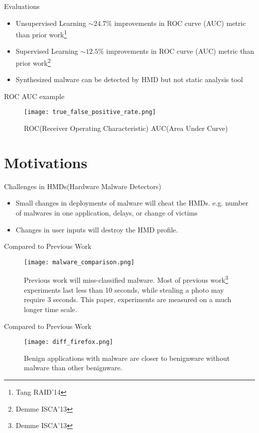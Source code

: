 \documentclass{beamer}
\begin{document}
\begin{frame}{Evaluations}
	\begin{itemize}
		\item Unsupervised Learning $\sim24.7\%$ improvements in ROC curve
			(AUC) metric than prior work\footnote[frame]{Tang RAID'14}
		\item Supervised Learning $\sim12.5\%$ improvements in ROC curve
			(AUC) metric than prior work\footnote[frame]{Demme ISCA'13}
		\item Synthesized malware can be detected by HMD but not static
			analysis tool
	\end{itemize}
\end{frame}

\begin{frame}{ROC AUC example}
	\begin{figure}
		\centering
		\texttt{[image: true\_false\_positive\_rate.png]}
		\caption{ROC(Receiver Operating Characteristic) AUC(Area Under Curve)}
	\end{figure}
\end{frame}

\section{Motivations}
\begin{frame}{Challenges in HMDs(Hardware Malware Detectors)}
	\begin{itemize}
		\item Small changes in deployments of malware will cheat the HMDs. 
			e.g. number of malwares in one application, delays, or change
			of victims
		\item Changes in user inputs will destroy the HMD profile.
	\end{itemize}
\end{frame}


\begin{frame}{Compared to Previous Work}
	\begin{figure}
		\centering
		\texttt{[image: malware\_comparison.png]}
		\caption{Previous work will miss-classified malware. Most of
			previous work\footnote{Demme ISCA'13} experiments last less than 10
			seconds, while stealing a photo may require 3 seconds.  This paper,
			experiments are measured on a much longer time scale.}
	\end{figure}
\end{frame}

\begin{frame}{Compared to Previous Work}
	\begin{figure}
		\centering
		\texttt{[image: diff\_firefox.png]}
		\caption{Benign applications with malware are closer to benignware
			without malware than other benignware.}
	\end{figure}
\end{frame}
\end{document}
